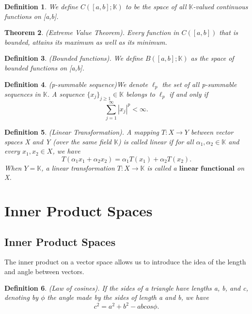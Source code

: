 \documentclass[twoside]{article}
\newcounter{lecnum}
\newtheorem{theorem}{Theorem}[lecnum]
\newtheorem{definition}[theorem]{Definition}
\begin{document}
\begin{definition}We define $C([a,b];\mathbb{K})$ to be the space of all $\mathbb{K}$-valued continuous functions on [a,b].
\end{definition}

\begin{theorem}(Extreme Value Theorem). Every function in $C([a,b])$ that is bounded, attains its maximum as well as its minimum.
\end{theorem}

\begin{definition}(Bounded functions). We define $B([a,b];\mathbb{K})$ as the space of bounded functions on [a,b].
\end{definition}

\begin{definition}(p-summable sequence)We denote $\ell_p$ the set of all p-summable sequences in $\mathbb{K}$. A sequence $\{x_j\}_{j \geq 1} \in \mathbb{K}$ belongs to $\ell_p$ if and only if
$$
\sum_{j=1}^{\infty}|x_j|^p < \infty.
$$
\end{definition}

\begin{definition}(Linear Transformation). A mapping $T: X \rightarrow Y$ between vector spaces X and Y (over the same field $\mathbb{K}$) is called linear if for all $\alpha_1, \alpha_2 \in \mathbb{K}$ and every $x_1, x_2 \in X$, we have
$$
T(\alpha_1x_1 + \alpha_2x_2) = \alpha_1T(x_1) + \alpha_2T(x_2).
$$
When $Y = \mathbb{K}$, a linear transformation $T: X \rightarrow \mathbb{K}$ is called a $\textbf{linear functional}$ on X.
\end{definition}

\section{Inner Product Spaces}
\subsection{Inner Product Spaces}

The inner product on a vector space allows us to introduce the idea of the length and angle
 between vectors. 

\begin{definition}(Law of cosines). If the sides of a triangle have lengths a, b, and c, denoting by $\phi$ the angle made by the sides of length a and b, we have
$$
c^2 = a^2 + b^2 -ab cos\phi.
$$
\end{definition}
\end{document}
